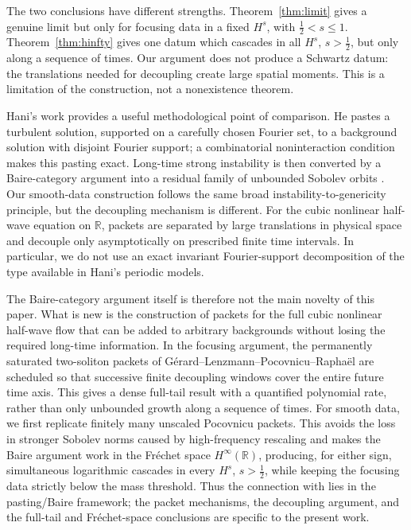 \documentclass[11pt,reqno]{amsart}
\numberwithin{equation}{section}
\theoremstyle{remark}
\newcommand{\half}{\frac12}
\begin{document}
The two conclusions have different strengths.  Theorem~\ref{thm:limit} gives a
genuine limit but only for focusing data in a fixed $H^s$, with
$\half<s\leq1$.  Theorem~\ref{thm:hinfty} gives one datum which cascades in all
$H^s$, $s>\half$, but only along a sequence of times.  Our argument does not
produce a Schwartz datum: the translations needed for decoupling create large
spatial moments.  This is a limitation of the construction, not a
nonexistence theorem.

Hani's work \cite{Hani} provides a useful methodological point of comparison. He pastes a turbulent solution, supported on a carefully chosen Fourier set, to a background solution with disjoint Fourier support; a combinatorial noninteraction condition makes this pasting exact. Long-time strong instability is then converted by a Baire-category argument into a residual family of unbounded Sobolev orbits \cite{Hani}. Our smooth-data construction follows the same broad instability-to-genericity principle, but the decoupling mechanism is different. For the cubic nonlinear half-wave equation on \(\mathbb R\), packets are separated by large translations in physical space and decouple only asymptotically on prescribed finite time intervals. In particular, we do not use an exact invariant Fourier-support decomposition of the type available in Hani's periodic models.

The Baire-category argument itself is therefore not the main novelty of this paper. What is new is the construction of packets for the full cubic nonlinear half-wave flow that can be added to arbitrary backgrounds without losing the required long-time information. In the focusing argument, the permanently saturated two-soliton packets of G\'erard--Lenzmann--Pocovnicu--Rapha\"el \cite{GLPR} are scheduled so that successive finite decoupling windows cover the entire future time axis. This gives a dense full-tail result with a quantified polynomial rate, rather than only unbounded growth along a sequence of times. For smooth data, we first replicate finitely many unscaled Pocovnicu packets. This avoids the loss in stronger Sobolev norms caused by high-frequency rescaling and makes the Baire argument work in the Fr\'echet space \(H^\infty(\mathbb R)\), producing, for either sign, simultaneous logarithmic cascades in every \(H^s\), \(s>\frac12\), while keeping the focusing data strictly below the mass threshold. Thus the connection with \cite{Hani} lies in the pasting/Baire framework; the packet mechanisms, the decoupling argument, and the full-tail and Fr\'echet-space conclusions are specific to the present work.
\end{document}
